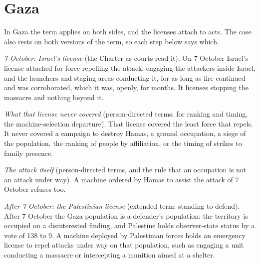 \section{Gaza}
\label{sec:6.8}
In Gaza the term applies on both sides, and the licenses attach to acts. The case also rests on both versions of the term, so each step below says which.

\emph{7 October: Israel's license} (the Charter as courts read it). On 7 October Israel's license attached for force repelling the attack: engaging the attackers inside Israel, and the launchers and staging areas conducting it, for as long as fire continued and was corroborated, which it was, openly, for months.
It licenses stopping the massacre and nothing beyond it.

\emph{What that license never covered} (person-directed terms; for ranking and timing, the machine-selection departure). That license covered the least force that repels. It never covered a campaign to destroy Hamas, a ground occupation, a siege of the population, the ranking of people by affiliation, or the timing of strikes to family presence.

\emph{The attack itself} (person-directed terms, and the rule that an occupation is not an attack under way). A machine ordered by Hamas to assist the attack of 7 October refuses too.

\emph{After 7 October: the Palestinian license} (extended term: standing to defend). After 7 October the Gaza population is a defender's population: the territory is occupied on a disinterested finding, and Palestine holds observer-state status by a vote of 138 to 9. A machine deployed by Palestinian forces holds an emergency license to repel attacks under way on that population, such as engaging a unit conducting a massacre or intercepting a munition aimed at a shelter.

